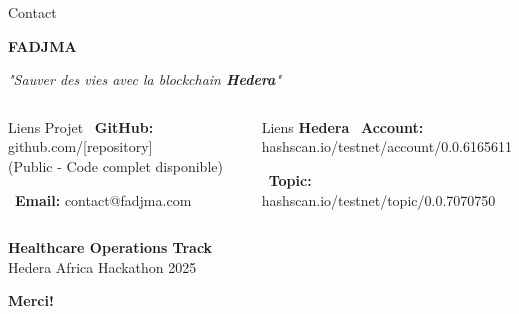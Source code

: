 \documentclass[aspectratio=169,11pt]{beamer}
\newcommand{\hedera}{\textbf{Hedera}\texttrademark}
\begin{document}
\begin{frame}{Contact}

\begin{center}
\Large{\textbf{FADJMA}}

\vspace{0.5cm}

\large{\textit{"Sauver des vies avec la blockchain \hedera"}}

\vspace{1cm}

\begin{columns}[c]
\begin{block}{Liens Projet}
\centering
\faGithub~\textbf{GitHub:} github.com/[repository] \\
\small{(Public - Code complet disponible)}

\vspace{0.3cm}

\faEnvelope~\textbf{Email:} contact@fadjma.com
\end{block}

\begin{block}{Liens \hedera}
\centering
\tiny
\faUser~\textbf{Account:} \\
hashscan.io/testnet/account/0.0.6165611

\vspace{0.2cm}

\faComments~\textbf{Topic:} \\
hashscan.io/testnet/topic/0.0.7070750
\end{block}
\end{columns}

\vspace{0.5cm}

\textbf{Healthcare Operations Track} \\
Hedera Africa Hackathon 2025

\vspace{0.5cm}

\Large{\textbf{Merci!}}
\end{center}

\end{frame}
\end{document}
